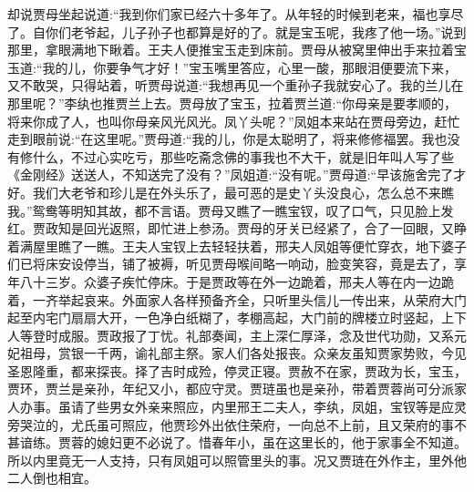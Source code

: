 


\begin{parag}
    却说贾母坐起说道:“我到你们家已经六十多年了。从年轻的时候到老来，福也享尽了。自你们老爷起，儿子孙子也都算是好的了。就是宝玉呢，我疼了他一场。”说到那里，拿眼满地下瞅着。王夫人便推宝玉走到床前。贾母从被窝里伸出手来拉着宝玉道:“我的儿，你要争气才好！”宝玉嘴里答应，心里一酸，那眼泪便要流下来，又不敢哭，只得站着，听贾母说道:“我想再见一个重孙子我就安心了。我的兰儿在那里呢？”李纨也推贾兰上去。贾母放了宝玉，拉着贾兰道:“你母亲是要孝顺的，将来你成了人，也叫你母亲风光风光。凤丫头呢？”凤姐本来站在贾母旁边，赶忙走到眼前说:“在这里呢。”贾母道:“我的儿，你是太聪明了，将来修修福罢。我也没有修什么，不过心实吃亏，那些吃斋念佛的事我也不大干，就是旧年叫人写了些《金刚经》送送人，不知送完了没有？”凤姐道:“没有呢。”贾母道:“早该施舍完了才好。我们大老爷和珍儿是在外头乐了，最可恶的是史丫头没良心，怎么总不来瞧我。”鸳鸯等明知其故，都不言语。贾母又瞧了一瞧宝钗，叹了口气，只见脸上发红。贾政知是回光返照，即忙进上参汤。贾母的牙关已经紧了，合了一回眼，又睁着满屋里瞧了一瞧。王夫人宝钗上去轻轻扶着，邢夫人凤姐等便忙穿衣，地下婆子们已将床安设停当，铺了被褥，听见贾母喉间略一响动，脸变笑容，竟是去了，享年八十三岁。众婆子疾忙停床。于是贾政等在外一边跪着，邢夫人等在内一边跪着，一齐举起哀来。外面家人各样预备齐全，只听里头信儿一传出来，从荣府大门起至内宅门扇扇大开，一色净白纸糊了，孝棚高起，大门前的牌楼立时竖起，上下人等登时成服。贾政报了丁忧。礼部奏闻，主上深仁厚泽，念及世代功勋，又系元妃祖母，赏银一千两，谕礼部主祭。家人们各处报丧。众亲友虽知贾家势败，今见圣恩隆重，都来探丧。择了吉时成殓，停灵正寝。贾赦不在家，贾政为长，宝玉，贾环，贾兰是亲孙，年纪又小，都应守灵。贾琏虽也是亲孙，带着贾蓉尚可分派家人办事。虽请了些男女外亲来照应，内里邢王二夫人，李纨，凤姐，宝钗等是应灵旁哭泣的，尤氏虽可照应，他贾珍外出依住荣府，一向总不上前，且又荣府的事不甚谙练。贾蓉的媳妇更不必说了。惜春年小，虽在这里长的，他于家事全不知道。所以内里竟无一人支持，只有凤姐可以照管里头的事。况又贾琏在外作主，里外他二人倒也相宜。
\end{parag}


